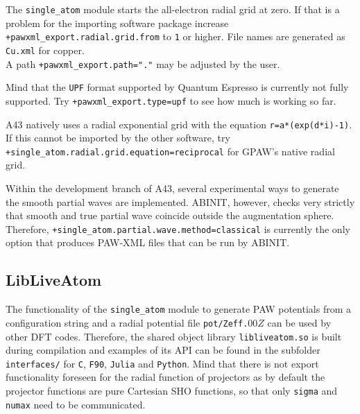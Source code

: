 \documentclass[oribibl]{llncs}
\newcommand{\ttt}[1]{\texttt{#1}}
\newcommand{\codename}{A43}
\begin{document}
\noindent
The \ttt{single\_atom} module starts the all-electron radial grid at zero.
If that is a problem for the importing software package increase \ttt{+pawxml\_export.radial.grid.from} to \ttt{1} or higher. File names are generated as \ttt{Cu.xml} for copper. \\
A path \ttt{+pawxml\_export.path="."} may be adjusted by the user. 

\noindent
Mind that the \ttt{UPF} format supported by Quantum Espresso\cite{qe} is currently not fully supported.
Try \ttt{+pawxml\_export.type=upf} to see how much is working so far.

\noindent
\codename{} natively uses a radial exponential grid with the equation \ttt{r=a*(exp(d*i)-1)}.
If this cannot be imported by the other software, try \ttt{+single\_atom.radial.grid.equation=reciprocal} for GPAW's native radial grid.

\noindent
Within the development branch of \codename{}, several experimental ways to generate the smooth partial waves
are implemented. ABINIT, however, checks very strictly that smooth and true partial wave coincide outside the augmentation sphere. Therefore, \ttt{+single\_atom.partial.wave.method=classical} is currently the only option that produces PAW-XML files that can be run by ABINIT.


\subsection{LibLiveAtom} \label{sec:lib-live-atom}
%
The functionality of the \ttt{single\_atom} module to generate \ac{PAW} potentials from a configuration string and a radial potential file \ttt{pot/Zeff.}$00Z$ can be used by other \ac{DFT} codes.
Therefore, the shared object library \ttt{libliveatom.so} is built during compilation and examples of its \ac{API} can be found in the subfolder \ttt{interfaces/} for \ttt{C}, \ttt{F90}, \ttt{Julia} and \ttt{Python}.
Mind that there is not export functionality foreseen for the radial function of projectors as by default the projector functions are pure Cartesian \ac{SHO} functions, so that only \ttt{sigma} and \ttt{numax} need to be communicated.
\end{document}
